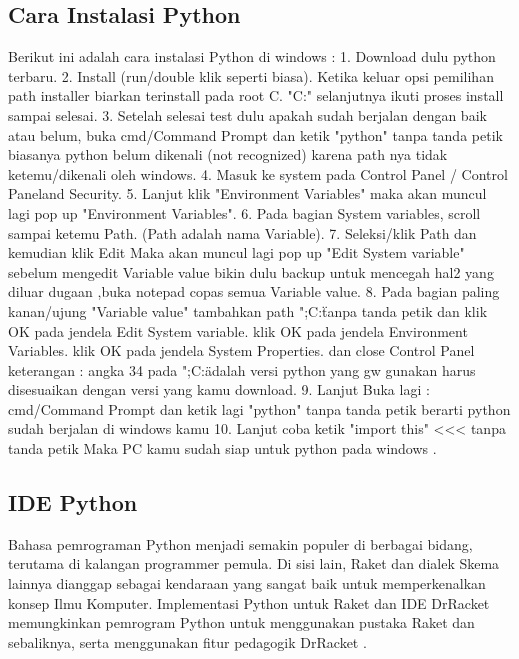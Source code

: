 \subsection{Cara Instalasi Python}
Berikut ini adalah cara instalasi Python di windows :
1.  Download dulu python terbaru.
2.  Install (run/double klik seperti biasa).
     Ketika keluar opsi pemilihan path installer biarkan terinstall pada root C. "C:"
     selanjutnya ikuti proses install sampai selesai.
3.  Setelah selesai test dulu apakah sudah berjalan dengan baik atau belum,
     buka cmd/Command Prompt dan ketik "python"  tanpa tanda petik
     biasanya python belum dikenali (not recognized) karena path nya tidak ketemu/dikenali oleh windows.
4.  Masuk ke system pada Control Panel / Control Panel\System and Security\System.
5.  Lanjut klik "Environment Variables" maka akan muncul lagi pop up "Environment Variables".
6.  Pada bagian System variables, scroll sampai ketemu Path. (Path adalah nama Variable).
7.  Seleksi/klik Path dan kemudian klik Edit
     Maka akan muncul lagi pop up "Edit System variable"
     sebelum mengedit Variable value bikin dulu backup untuk mencegah hal2 yang diluar dugaan ,buka notepad copas semua Variable value.
8. Pada bagian paling kanan/ujung "Variable value"
    tambahkan path  ";C:\"  tanpa tanda petik
    dan klik OK pada jendela Edit System variable.
    klik OK pada jendela Environment Variables.
    klik OK pada jendela System Properties.
    dan close Control Panel
    keterangan : angka 34 pada ";C:\"adalah versi python yang gw gunakan harus disesuaikan dengan versi yang kamu download.
9. Lanjut Buka lagi : cmd/Command Prompt dan ketik lagi "python" tanpa tanda petik 
    berarti python sudah berjalan di windows kamu
10. Lanjut coba ketik "import this" <<< tanpa tanda petik
     Maka PC kamu sudah siap untuk python pada windows \cite{nahado2015bumbu}.

\subsection {IDE Python}

Bahasa pemrograman Python menjadi semakin populer di berbagai bidang, terutama di kalangan programmer pemula. Di sisi lain, Raket dan dialek Skema lainnya dianggap sebagai kendaraan yang sangat baik untuk memperkenalkan konsep Ilmu Komputer. Implementasi Python untuk Raket dan IDE DrRacket memungkinkan pemrogram Python untuk menggunakan pustaka Raket dan sebaliknya, serta menggunakan fitur pedagogik DrRacket \cite {ramos2014implementing}.









